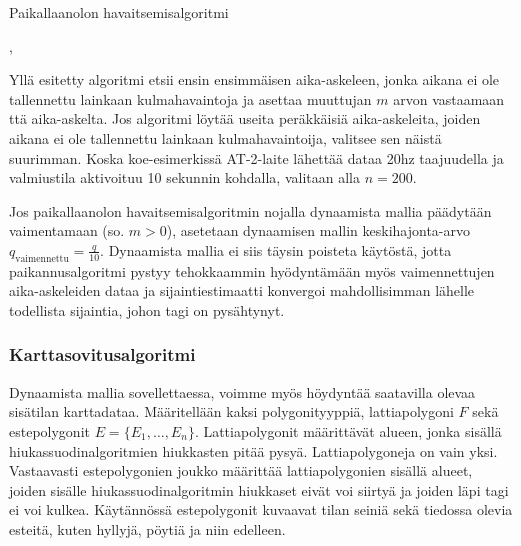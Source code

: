 \documentclass[
  12pt,
  a4paper, twoside]{book}
\begin{document}
\begin{algorithm}[H]
\label{paikallaanoloalgo}
\DontPrintSemicolon
\SetAlgoShortEnd
{}
\caption{Paikallaanolon havaitsemisalgoritmi}
\end{algorithm}

,

Yllä esitetty algoritmi etsii ensin ensimmäisen aika-askeleen, jonka aikana ei ole tallennettu lainkaan kulmahavaintoja ja asettaa muuttujan \(m\) arvon vastaamaan ttä aika-askelta. Jos algoritmi löytää useita peräkkäisiä aika-askeleita, joiden aikana ei ole tallennettu lainkaan kulmahavaintoija, valitsee sen näistä suurimman. Koska koe-esimerkissä AT-2-laite lähettää dataa 20hz taajuudella ja valmiustila aktivoituu 10 sekunnin kohdalla, valitaan alla \(n=200\).

Jos paikallaanolon havaitsemisalgoritmin nojalla dynaamista mallia päädytään vaimentamaan (so. \(m>0\)), asetetaan dynaamisen mallin keskihajonta-arvo \(q_{\text{vaimennettu}}=\frac{q}{10}\). Dynaamista mallia ei siis täysin poisteta käytöstä, jotta paikannusalgoritmi pystyy tehokkaammin hyödyntämään myös vaimennettujen aika-askeleiden dataa ja sijaintiestimaatti konvergoi mahdollisimman lähelle todellista sijaintia, johon tagi on pysähtynyt.

\hypertarget{karttasovitusalgoritmi}{%
\subsubsection{Karttasovitusalgoritmi}\label{karttasovitusalgoritmi}}

Dynaamista mallia sovellettaessa, voimme myös höydyntää saatavilla olevaa sisätilan karttadataa. Määritellään kaksi polygonityyppiä, lattiapolygoni \(F\) sekä estepolygonit \(E=\{E_1,\ldots,E_n\}\). Lattiapolygonit määrittävät alueen, jonka sisällä hiukassuodinalgoritmien hiukkasten pitää pysyä. Lattiapolygoneja on vain yksi. Vastaavasti estepolygonien joukko määrittää lattiapolygonien sisällä alueet, joiden sisälle hiukassuodinalgoritmin hiukkaset eivät voi siirtyä ja joiden läpi tagi ei voi kulkea. Käytännössä estepolygonit kuvaavat tilan seiniä sekä tiedossa olevia esteitä, kuten hyllyjä, pöytiä ja niin edelleen.
\end{document}
